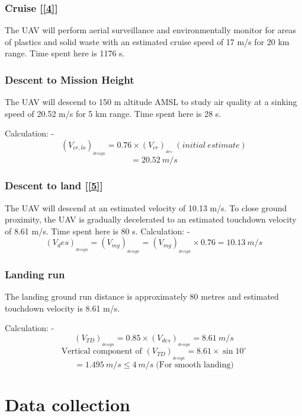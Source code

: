 \documentclass[12 pt]{article}
\begin{document}
\subsubsection{Cruise {[\ref{4}]}}
The UAV will perform aerial surveillance and environmentally monitor for areas of plastics and solid waste with an estimated cruise speed of 17 m/s for 20 km range. Time spent here is 1176 s.

\subsubsection{Descent to Mission Height}
The UAV will descend to 150 m altitude AMSL to study air quality at a sinking speed of 20.52 m/s for 5 km range. Time spent here is 28 s.

Calculation: - 
$$ (V_{cr,lo})_{_{design}} = 0.76 \times (V_{cr})_{_{des}} \;  (initial \: estimate) $$
$$ = 20.52 \: m/s $$

\subsubsection{Descent to land {[\ref{5}]}}
The UAV will descend at an estimated velocity of 10.13 m/s. To close ground proximity, the UAV is gradually decelerated to an estimated touchdown velocity of 8.61 m/s. Time spent here is 80 s.
Calculation: - 
$$(V_des)_{_{design}} = (V_{mg})_{_{design}} = (V_{mg})_{_{design}} \times 0.76 = 10.13 \: m/s $$

\subsubsection{Landing run}
The landing ground run distance is approximately 80 metres and estimated touchdown velocity is 8.61 m/s.

Calculation: - 
$$ (V_{TD})_{_{design}} = 0.85 \times (V_{des})_{_{design}} = 8.61 \: m/s  $$
$$ \text{Vertical component of } (V_{TD})_{_{design}} = 8.61 \times \sin{10^{\circ}} $$
$$ = 1.495 \: m/s \leq 4 \: m/s \; \text{(For smooth landing)} $$



\section{Data collection}
\end{document}
